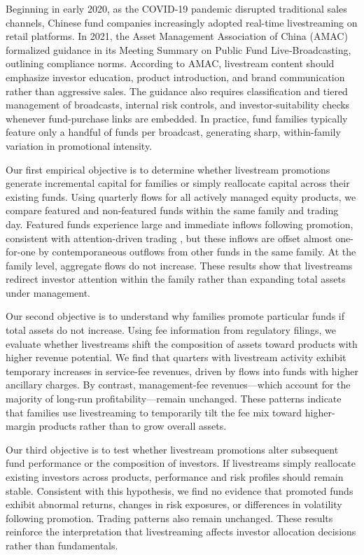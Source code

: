\documentclass[12pt]{article}
\begin{document}
Beginning in early 2020, as the COVID‑19 pandemic disrupted traditional sales channels, Chinese fund companies increasingly adopted real-time livestreaming on retail platforms. In 2021, the Asset Management Association of China (AMAC) formalized guidance in its Meeting Summary on Public Fund Live‑Broadcasting, outlining compliance norms. According to AMAC, livestream content should emphasize investor education, product introduction, and brand communication rather than aggressive sales. The guidance also requires classification and tiered management of broadcasts, internal risk controls, and investor-suitability checks whenever fund-purchase links are embedded. In practice, fund families typically feature only a handful of funds per broadcast, generating sharp, within-family variation in promotional intensity.

Our first empirical objective is to determine whether livestream promotions generate incremental capital for families or simply reallocate capital across their existing funds. Using quarterly flows for all actively managed equity products, we compare featured and non-featured funds within the same family and trading day. Featured funds experience large and immediate inflows following promotion, consistent with attention-driven trading \citep{barber2008glitters}, but these inflows are offset almost one-for-one by contemporaneous outflows from other funds in the same family. At the family level, aggregate flows do not increase. These results show that livestreams redirect investor attention within the family rather than expanding total assets under management.

Our second objective is to understand why families promote particular funds if total assets do not increase. Using fee information from regulatory filings, we evaluate whether livestreams shift the composition of assets toward products with higher revenue potential. We find that quarters with livestream activity exhibit temporary increases in service-fee revenues, driven by flows into funds with higher ancillary charges. By contrast, management-fee revenues—which account for the majority of long-run profitability—remain unchanged. These patterns indicate that families use livestreaming to temporarily tilt the fee mix toward higher-margin products rather than to grow overall assets.

Our third objective is to test whether livestream promotions alter subsequent fund performance or the composition of investors. If livestreams simply reallocate existing investors across products, performance and risk profiles should remain stable. Consistent with this hypothesis, we find no evidence that promoted funds exhibit abnormal returns, changes in risk exposures, or differences in volatility following promotion. Trading patterns also remain unchanged. These results reinforce the interpretation that livestreaming affects investor allocation decisions rather than fundamentals.
\end{document}

